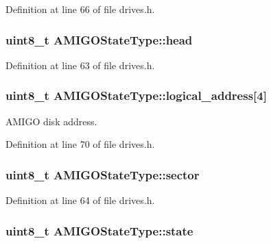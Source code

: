 Definition at line 66 of file drives.\+h.

\subsubsection[{\texorpdfstring{head}{head}}]{\setlength{\rightskip}{0pt plus 5cm}uint8\+\_\+t A\+M\+I\+G\+O\+State\+Type\+::head}\hypertarget{structAMIGOStateType_a92b01a4e3912d2fcacebcc15a21c66c9}{}\label{structAMIGOStateType_a92b01a4e3912d2fcacebcc15a21c66c9}


Definition at line 63 of file drives.\+h.

\subsubsection[{\texorpdfstring{logical\+\_\+address}{logical_address}}]{\setlength{\rightskip}{0pt plus 5cm}uint8\+\_\+t A\+M\+I\+G\+O\+State\+Type\+::logical\+\_\+address\mbox{[}4\mbox{]}}\hypertarget{structAMIGOStateType_a924a685ad68765a91714aa6ad4b20d9f}{}\label{structAMIGOStateType_a924a685ad68765a91714aa6ad4b20d9f}


A\+M\+I\+GO disk address. 



Definition at line 70 of file drives.\+h.

\subsubsection[{\texorpdfstring{sector}{sector}}]{\setlength{\rightskip}{0pt plus 5cm}uint8\+\_\+t A\+M\+I\+G\+O\+State\+Type\+::sector}\hypertarget{structAMIGOStateType_a90615dad99e4fb6852b176bf6712f40b}{}\label{structAMIGOStateType_a90615dad99e4fb6852b176bf6712f40b}


Definition at line 64 of file drives.\+h.

\subsubsection[{\texorpdfstring{state}{state}}]{\setlength{\rightskip}{0pt plus 5cm}uint8\+\_\+t A\+M\+I\+G\+O\+State\+Type\+::state}\hypertarget{structAMIGOStateType_ab3ba7202566a784c93d437960f8f332e}{}\label{structAMIGOStateType_ab3ba7202566a784c93d437960f8f332e}


